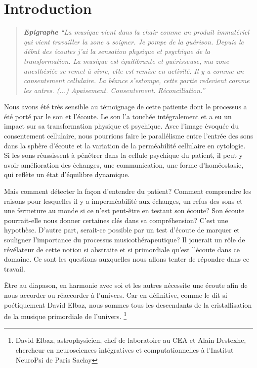 \chapter{Introduction}



\begin{quotation}
 \textit{\textbf{Epigraphe  }   ``La musique vient dans la chair comme un produit immatériel
 qui vient travailler la zone a soigner. Je pompe de la
 guérison.
Depuis le début des écoutes j'ai la sensation physique et
 psychique de la
 transformation.
 La musique est équilibrante et guérisseuse, ma zone
 anesthésiée se remet à vivre, elle est remise en activité.
 Il y a comme un consentement cellulaire.
La béance s'estompe, cette
partie redevient comme les autres. (...)
Apaisement. Consentement. Réconciliation.''}

\end{quotation}

Nous avons été très sensible au témoignage de cette patiente dont le
processus a été porté par le son et l'écoute. Le son l'a touchée intégralement et a eu un impact sur sa transformation physique
et psychique.
Avec l'image évoquée du
consentement cellulaire, nous pourrions faire le
parallélisme entre l'entrée des sons dans la sphère d'écoute et la variation de la 
perméabilité cellulaire en cytologie.\autocite[ch. 3 pp. 70--76]{marieb:biologie}  Si les sons réussissent à pénétrer dans la
cellule psychique du patient, il peut y avoir amélioration des
échanges, une 
communication, une forme d'homéostasie,  \autocite[ch. 1
pp. 10]{marieb:biologie} qui reflète un état d'équilibre dynamique.

Mais comment détecter la façon d'entendre du patient?
Comment comprendre les raisons pour lesquelles il y a imperméabilité aux
échanges, un refus des sons et une fermeture au monde si ce n'est
peut-être  en testant
son écoute?  Son écoute pourrait-elle nous donner certaines clés dans sa
compréhension? C'est une hypothèse.
D'autre part, serait-ce  possible  par un test d'écoute
de marquer et souligner l'importance du processus musicothérapeutique? 
Il jouerait un
rôle de
révélateur de cette notion si abstraite et si primordiale qu'est
l'écoute dans ce domaine.
Ce sont les questions auxquelles nous allons tenter de
répondre dans ce travail.


Être au diapason, en harmonie avec soi et les autres
nécessite une écoute afin de nous accorder ou réaccorder à l'univers.
Car en définitive, comme le dit si poétiquement David Elbaz, nous sommes tous les
descendants de la cristallisation de la musique primordiale de
l'univers. \autocite{delbaz_recherche_2016} \footnote{David Elbaz, astrophysicien, chef de laboratoire au CEA et Alain
Destexhe, chercheur en neurosciences intégratives et computationnelles
à l'Institut  NeuroPsi de Paris Saclay} 

